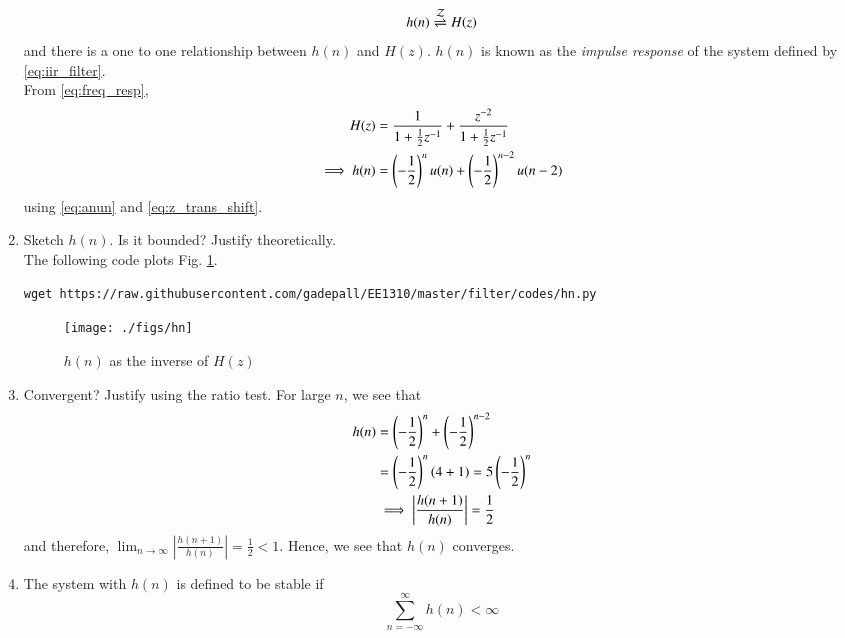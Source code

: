 \documentclass[journal,12pt,twocolumn]{IEEEtran}
\renewcommand\thesection{\arabic{section}}
\begin{document}
\begin{enumerate}[label=\thesection.\arabic*]
\begin{equation}
\label{eq:impulse_resp}
h(n) \overset{\mathcal{Z}}{ \rightleftharpoons} H(z)
\end{equation}
and there is a one to one relationship between $h(n)$ and $H(z)$. $h(n)$ is known as the {\em impulse response} of the
system defined by \eqref{eq:iir_filter}.
\\
\solution From \eqref{eq:freq_resp},
\begin{align}
H(z) &= \frac{1}{1 + \frac{1}{2}z^{-1}} + \frac{ z^{-2}}{1 + \frac{1}{2}z^{-1}}
\\
\implies h(n) &= \left(-\frac{1}{2}\right)^{n}u(n) + \left(-\frac{1}{2}\right)^{n-2}u(n-2)
\label{eq:h(n)}
\end{align}
using \eqref{eq:anun} and \eqref{eq:z_trans_shift}.
\item Sketch $h(n)$. Is it bounded? Justify theoretically.
\\
\solution The following code plots Fig. \ref{fig:hn}.
\begin{lstlisting}
wget https://raw.githubusercontent.com/gadepall/EE1310/master/filter/codes/hn.py
\end{lstlisting}
\begin{figure}[!ht]
\centering
\texttt{[image: ./figs/hn]}
\caption{$h(n)$ as the inverse of $H(z)$}
\label{fig:hn}
\end{figure}
%
\item Convergent? Justify using the ratio test.
\solution
For large $n$, we see that 
\begin{align}
	h(n) &= \left(-\frac{1}{2}\right)^n + \left(-\frac{1}{2}\right)^{n - 2} \\
		 &= \left(-\frac{1}{2}\right)^{n}\left(4 + 1\right) = 5\left(-\frac{1}{2}\right)^n \\
		 &\implies \left|\frac{h(n + 1)}{h(n)}\right| = \frac{1}{2}
\end{align}
and therefore, $\lim_{n \to \infty}\left|\frac{h(n + 1)}{h(n)}\right| = \frac{1}{2} < 1$. Hence, we see that $h(n)$ converges.
\item The system with $h(n)$ is defined to be stable if
\begin{equation}
\sum_{n=-\infty}^{\infty}h(n) < \infty
\end{equation}


\end{enumerate}
\end{document}
